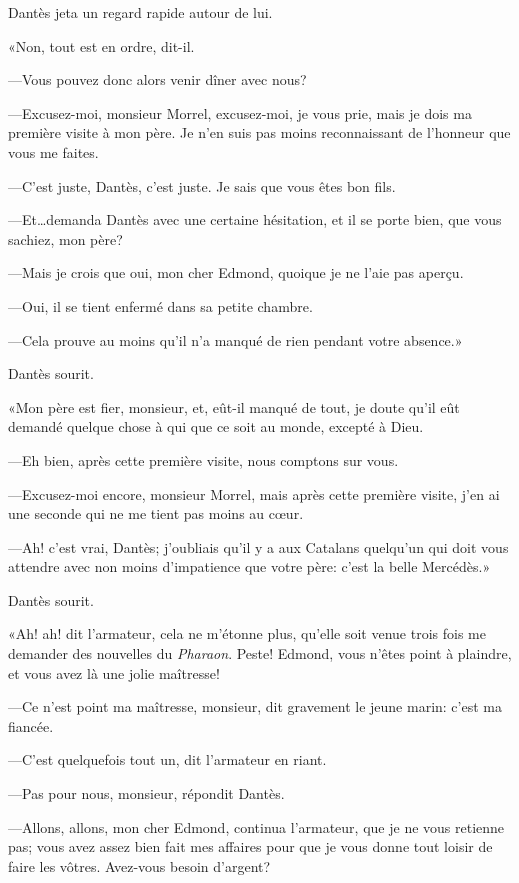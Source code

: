 Dantès jeta un regard rapide autour de lui.

«Non, tout est en ordre, dit-il.

—Vous pouvez donc alors venir dîner avec nous?

—Excusez-moi, monsieur Morrel, excusez-moi, je vous prie, mais je dois ma première visite à mon père. Je n'en suis pas moins reconnaissant de l'honneur que vous me faites.

—C'est juste, Dantès, c'est juste. Je sais que vous êtes bon fils.

—Et\dots demanda Dantès avec une certaine hésitation, et il se porte bien, que vous sachiez, mon père?

—Mais je crois que oui, mon cher Edmond, quoique je ne l'aie pas aperçu.

—Oui, il se tient enfermé dans sa petite chambre.

—Cela prouve au moins qu'il n'a manqué de rien pendant votre absence.»

Dantès sourit.

«Mon père est fier, monsieur, et, eût-il manqué de tout, je doute qu'il eût demandé quelque chose à qui que ce soit au monde, excepté à Dieu.

—Eh bien, après cette première visite, nous comptons sur vous.

—Excusez-moi encore, monsieur Morrel, mais après cette première visite, j'en ai une seconde qui ne me tient pas moins au cœur.

—Ah! c'est vrai, Dantès; j'oubliais qu'il y a aux Catalans quelqu'un qui doit vous attendre avec non moins d'impatience que votre père: c'est la belle Mercédès.»

Dantès sourit.

«Ah! ah! dit l'armateur, cela ne m'étonne plus, qu'elle soit venue trois fois me demander des nouvelles du \textit{Pharaon}. Peste! Edmond, vous n'êtes point à plaindre, et vous avez là une jolie maîtresse!

—Ce n'est point ma maîtresse, monsieur, dit gravement le jeune marin: c'est ma fiancée.

—C'est quelquefois tout un, dit l'armateur en riant.

—Pas pour nous, monsieur, répondit Dantès.

—Allons, allons, mon cher Edmond, continua l'armateur, que je ne vous retienne pas; vous avez assez bien fait mes affaires pour que je vous donne tout loisir de faire les vôtres. Avez-vous besoin d'argent?

